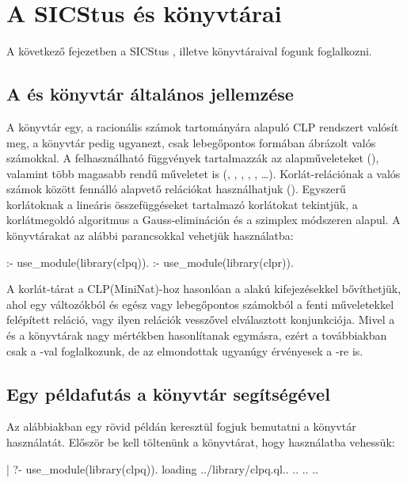 \clearpage

\chapter{A SICStus \clpq és \clpr könyvtárai}

A következő fejezetben a SICStus \clpq, illetve \clpr könyvtáraival
fogunk foglalkozni.

\section{A \clpq és \clpr könyvtár általános jellemzése}

A \clpq könyvtár egy, a racionális számok tartományára
alapuló CLP rendszert valósít meg, a \clpr könyvtár pedig ugyanezt, csak
lebegőpontos formában ábrázolt valós számokkal. A felhasználható függvények
tartalmazzák az alapműveleteket (\cd{+ - * /}), valamint több magasabb rendű
műveletet is (, , , , , \ldots).
Korlát-relációnak a valós számok között fennálló alapvető relációkat
használhatjuk (\cd{= =:= < > =< >= =\bs=}). Egyszerű korlátoknak a lineáris
összefüggéseket tartalmazó korlátokat tekintjük, a korlátmegoldó algoritmus
a Gauss-elimináción és a szimplex módszeren alapul. A könyvtárakat az alábbi
parancsokkal vehetjük használatba:

\begin{prologcode}
:- use_module(library(clpq)).
:- use_module(library(clpr)).
\end{prologcode}

A korlát-tárat a CLP(MiniNat)-hoz hasonlóan a  alakú
kifejezésekkel bővíthetjük, ahol  egy változókból és egész vagy
lebegőpontos számokból a fenti műveletekkel felépített reláció, vagy
ilyen relációk vesszővel elválasztott konjunkciója.
\br
Mivel a \clpq és a \clpr könyvtárak nagy mértékben hasonlítanak
egymásra, ezért a továbbiakban csak a \Clpq-val foglalkozunk, de az
elmondottak ugyanúgy érvényesek a \Clpr-re is.

\section{Egy példafutás a \clpq könyvtár segítségével}

Az alábbiakban egy rövid példán keresztül fogjuk bemutatni a \clpq
könyvtár használatát.
\br
Először be kell töltenünk a \clpq könyvtárat, hogy használatba vehessük:

\begin{prologcode}
| ?- use_module(library(clpq)).
{ loading ../library/clpq.ql.. }
.. .. ..
\end{prologcode}

